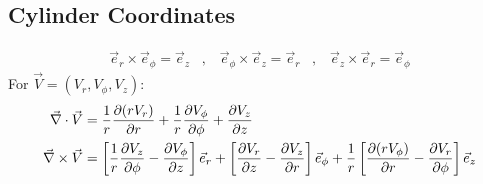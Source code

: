 \subsection{Cylinder Coordinates}
\begin{align*}
    \vec{e}_r \times \vec{e}_\phi = \vec{e}_z
    \hspace{10pt} , \hspace{10pt}
    \vec{e}_\phi \times \vec{e}_z = \vec{e}_r
    \hspace{10pt} , \hspace{10pt}
    \vec{e}_z \times \vec{e}_r = \vec{e}_\phi
\end{align*}
For $\vec{V} = (V_r,V_\phi,V_z)$:
\begin{align*}
    \vec{\nabla} \cdot \vec{V} &=
    \frac{1}{r} \frac{\partial(r V_r)}{\partial r} + \frac{1}{r} \frac{\partial V_\phi}{\partial \phi} + \frac{\partial V_z}{\partial z}
    \\
    \vec{\nabla} \times \vec{V} &=
    \left[ \frac{1}{r} \frac{\partial V_z}{\partial \phi} - \frac{\partial V_\phi}{\partial z} \right] \vec{e}_r
    + \left[ \frac{\partial V_r}{\partial z} - \frac{\partial V_z}{\partial r} \right] \vec{e}_\phi
    + \frac{1}{r} \left[ \frac{\partial(r V_\phi)}{\partial r} - \frac{\partial V_r}{\partial \phi} \right] \vec{e}_z
\end{align*}





